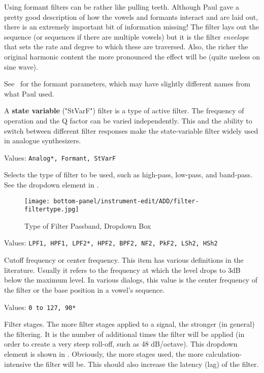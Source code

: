    Using formant filters can be rather like pulling teeth.  Although Paul gave
   a pretty good description of how the vowels and formants interact and are
   laid out, there is an extremely important bit of information missing!  The
   filter lays out the sequence (or sequences if there are multiple vowels) but
   it is the filter \textsl{envelope} that sets the rate and degree to which
   these are traversed. Also, the richer the original harmonic content the more
   pronounced the effect will be (quite useless on sine wave).

   See ~for the formant parameters,
   which may have slightly different names from what Paul used.

   A \textbf{state variable} ("StVarF") filter
   is a type of active filter.
   The frequency of operation and the Q factor can be varied independently.
   This and the ability to switch between different filter responses make the
   state-variable filter widely used in analogue synthesizers.

   Values: \texttt{Analog*, Formant, StVarF}

   Selects the type of filter to be used, such as high-pass, low-pass,
   and band-pass.
   See the dropdown element in .

\begin{figure}[H]
   \centering
   \texttt{[image: bottom-panel/instrument-edit/ADD/filter-filtertype.jpg]}
   \caption[Filter Type Dropdown]{Type of Filter Passband, Dropdown Box}
   \label{fig:filter_type_dropdown}
\end{figure}

   Values: \texttt{LPF1, HPF1, LPF2*, HPF2, BPF2, NF2, PkF2, LSh2, HSh2}

   Cutoff frequency or center frequency.
   This item has various definitions in the literature.
   Usually it refers to the frequency at which the level
   drops to 3dB below the maximum level.
   In various dialogs, this value is the
   center frequency of the filter or the base position in
   a vowel's sequence.

   Values: \texttt{0 to 127, 90*}

   Filter stages.
   The more filter stages applied to a signal, the stronger (in general) the
   filtering.
   It is the number of additional times the filter will be applied (in
   order to create a very steep roll-off, such as 48 dB/octave).
   This dropdown element is shown in
   .
   Obviously, the more stages used, the more calculation-intensive the
   filter will be.  This should also increase the latency (lag) of the
   filter.

